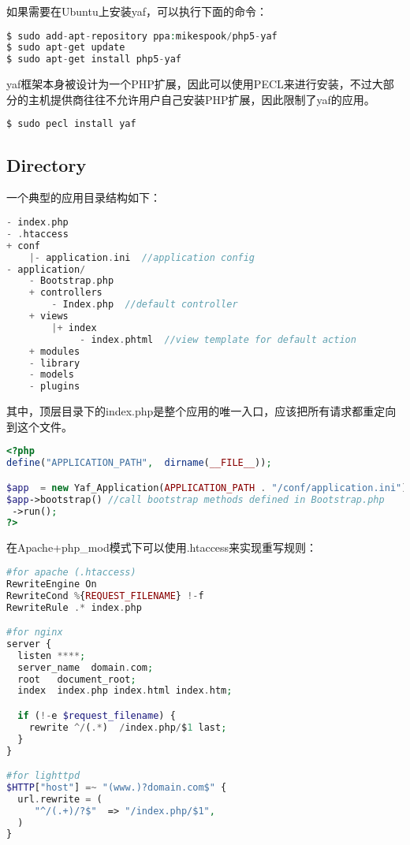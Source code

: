 如果需要在Ubuntu上安装yaf，可以执行下面的命令：


\begin{lstlisting}[language=PHP]
$ sudo add-apt-repository ppa:mikespook/php5-yaf
$ sudo apt-get update
$ sudo apt-get install php5-yaf
\end{lstlisting}

yaf框架本身被设计为一个PHP扩展，因此可以使用PECL来进行安装，不过大部分的主机提供商往往不允许用户自己安装PHP扩展，因此限制了yaf的应用。

\begin{lstlisting}[language=PHP]
$ sudo pecl install yaf
\end{lstlisting}




\subsection{Directory}


一个典型的应用目录结构如下：

\begin{lstlisting}[language=PHP]
- index.php 
- .htaccess 
+ conf
    |- application.ini  //application config
- application/
    - Bootstrap.php   
    + controllers
        - Index.php  //default controller
    + views    
        |+ index   
             - index.phtml  //view template for default action
    + modules 
    - library
    - models  
    - plugins 
\end{lstlisting}

其中，顶层目录下的index.php是整个应用的唯一入口，应该把所有请求都重定向到这个文件。




\begin{lstlisting}[language=PHP]
<?php
define("APPLICATION_PATH",  dirname(__FILE__));

$app  = new Yaf_Application(APPLICATION_PATH . "/conf/application.ini");
$app->bootstrap() //call bootstrap methods defined in Bootstrap.php
 ->run();
?>
\end{lstlisting}





在Apache+php\_mod模式下可以使用.htaccess来实现重写规则：

\begin{lstlisting}[language=PHP]
#for apache (.htaccess)
RewriteEngine On
RewriteCond %{REQUEST_FILENAME} !-f
RewriteRule .* index.php

#for nginx
server {
  listen ****;
  server_name  domain.com;
  root   document_root;
  index  index.php index.html index.htm;

  if (!-e $request_filename) {
    rewrite ^/(.*)  /index.php/$1 last;
  }
}

#for lighttpd
$HTTP["host"] =~ "(www.)?domain.com$" {
  url.rewrite = (
     "^/(.+)/?$"  => "/index.php/$1",
  )
}
\end{lstlisting}




